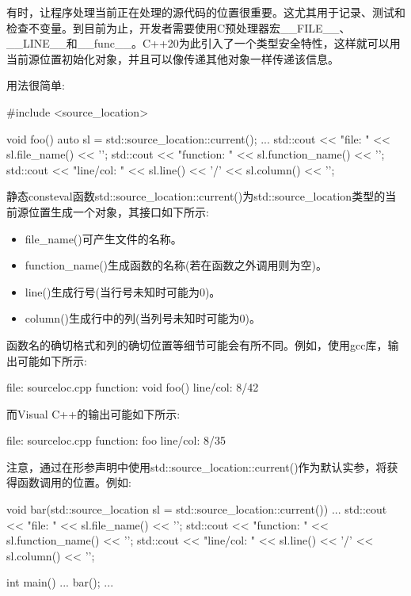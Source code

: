 有时，让程序处理当前正在处理的源代码的位置很重要。这尤其用于记录、测试和检查不变量。到目前为止，开发者需要使用C预处理器宏\_\_FILE\_\_、\_\_LINE\_\_和\_\_func\_\_。C++20为此引入了一个类型安全特性，这样就可以用当前源位置初始化对象，并且可以像传递其他对象一样传递该信息。

用法很简单:

\begin{cpp}
#include <source_location>

void foo()
{
	auto sl = std::source_location::current();
	...
	std::cout << "file: " << sl.file_name() << '\n';
	std::cout << "function: " << sl.function_name() << '\n';
	std::cout << "line/col: " << sl.line() << '/' << sl.column() << '\n';
}
\end{cpp}

静态consteval函数std::source\_location::current()为std::source\_location类型的当前源位置生成一个对象，其接口如下所示:

\begin{itemize}
\item 
file\_name()可产生文件的名称。

\item 
function\_name()生成函数的名称(若在函数之外调用则为空)。

\item 
line()生成行号(当行号未知时可能为0)。

\item 
column()生成行中的列(当列号未知时可能为0)。
\end{itemize}

函数名的确切格式和列的确切位置等细节可能会有所不同。例如，使用gcc库，输出可能如下所示:

\begin{shell}
file:     sourceloc.cpp
function: void foo()
line/col: 8/42
\end{shell}

而Visual C++的输出可能如下所示:

\begin{shell}
file:     sourceloc.cpp
function: foo
line/col: 8/35
\end{shell}

注意，通过在形参声明中使用std::source\_location::current()作为默认实参，将获得函数调用的位置。例如:

\begin{cpp}
void bar(std::source_location sl = std::source_location::current())
{
	...
	std::cout << "file: " << sl.file_name() << '\n';
	std::cout << "function: " << sl.function_name() << '\n';
	std::cout << "line/col: " << sl.line() << '/' << sl.column() << '\n';
}

int main()
{
	...
	bar();
	...
}
\end{cpp}

